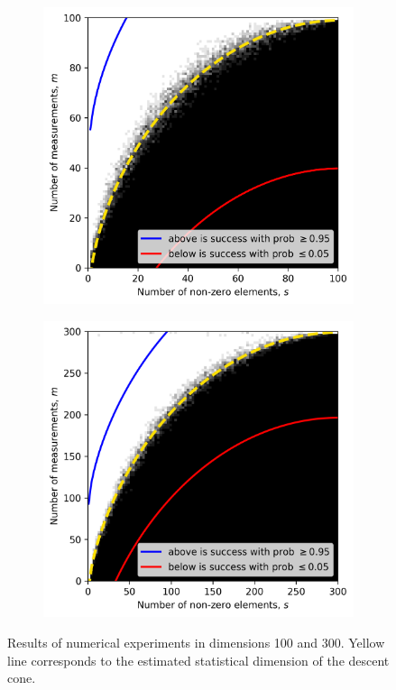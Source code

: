 \begin{figure}
    \begin{subfigure}{0.5\textwidth}
            \includegraphics[width=\linewidth]{pictures/lote_estimates}
        \caption{}
    \end{subfigure}
    \begin{subfigure}{0.5\textwidth}
            \includegraphics[width=\linewidth]{pictures/lote_estimates_d300}
        \caption{}
    \end{subfigure}

    \caption{\centering Results of numerical experiments in dimensions 100 and 300. Yellow line corresponds to the estimated statistical
    dimension of the descent cone.}
    \label{fig:lote}
\end{figure}

